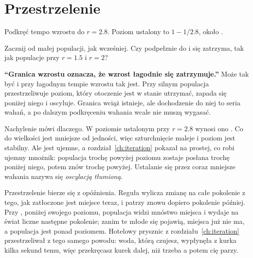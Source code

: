 \section{Przestrzelenie}
\label{sec:ch03-overshoot}

\noindent
Podkręć tempo wzrostu do $r = \num{2.8}$. Poziom ustalony to
$1 - 1/\num{2.8}$, około .

\begin{think}
Zacznij od małej populacji, jak wcześniej. Czy podpełznie do
 i się zatrzyma, tak jak populacje przy
$r = \num{1.5}$ i $r = 2$?
\end{think}

\begin{trapbox}
\textbf{\enquote{Granica wzrostu oznacza, że wzrost łagodnie się
zatrzymuje.}} Może tak być i przy łagodnym tempie wzrostu tak jest. Przy
silnym populacja przestrzeliwuje poziom, który otoczenie jest w stanie
utrzymać, zapada się poniżej niego i oscyluje. Granica wciąż istnieje, ale
dochodzenie do niej to seria wahań, a po dalszym podkręceniu wahania wcale
nie muszą wygasać.
\end{trapbox}

\noindent
Nachylenie mówi dlaczego. W poziomie ustalonym przy $r = \num{2.8}$ wynosi
ono . Co do wielkości jest mniejsze od jedności, więc
szturchnięcie maleje i poziom jest stabilny. Ale jest ujemne, a
rozdział~\ref{ch:iteration} pokazał na prostej, co robi ujemny mnożnik:
populacja trochę powyżej poziomu zostaje posłana trochę poniżej niego, potem
znów trochę powyżej. Ustalanie się przez coraz mniejsze wahania nazywa się
\emph{oscylacją tłumioną}.

Przestrzelenie bierze się z opóźnienia. Reguła wylicza zmianę na całe
pokolenie z tego, jak zatłoczone jest miejsce teraz, i patrzy znowu dopiero
pokolenie później. Przy , poniżej swojego poziomu,
populacja widzi mnóstwo miejsca i wydaje na świat liczne następne pokolenie;
zanim te młode się pojawią, miejsca już nie ma, a populacja jest ponad
poziomem. Hotelowy prysznic z rozdziału~\ref{ch:iteration} przestrzeliwał
z tego samego powodu: woda, którą czujesz, wypłynęła z kurka kilka sekund
temu, więc przekręcasz kurek dalej, niż trzeba \dash{} a potem cię parzy.

